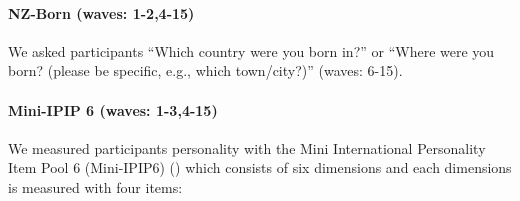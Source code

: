 \documentclass[
  singlecolumn]{article}
\let\oldparagraph\paragraph
\renewcommand{\paragraph}[1]{\oldparagraph{#1}\mbox{}}
\begin{document}
\paragraph{NZ-Born (waves: 1-2,4-15)}\label{nz-born-waves-1-24-15}

We asked participants ``Which country were you born in?'' or ``Where
were you born? (please be specific, e.g., which town/city?)'' (waves:
6-15).

\paragraph{Mini-IPIP 6 (waves:
1-3,4-15)}\label{mini-ipip-6-waves-1-34-15}

We measured participants personality with the Mini International
Personality Item Pool 6 (Mini-IPIP6) () which consists of six dimensions and each
dimensions is measured with four items:
\end{document}
